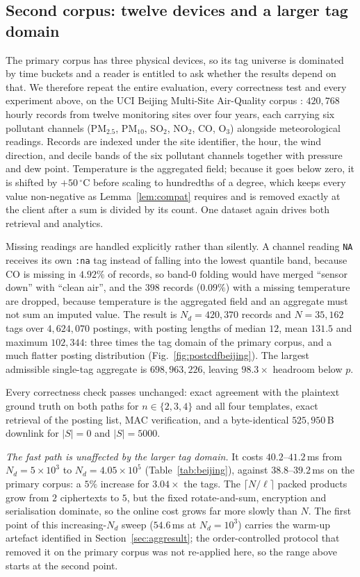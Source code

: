 \documentclass[a4paper,fleqn]{cas-dc}
\begin{document}
\subsection{Second corpus: twelve devices and a larger tag domain}
\label{sec:secondcorpus}
The primary corpus has three physical devices, so its tag universe is
dominated by time buckets and a reader is entitled to ask whether the results
depend on that. We therefore repeat the entire evaluation, every correctness
test and every experiment above, on the UCI Beijing Multi-Site Air-Quality
corpus \citep{zhang2017cautionary}: $420{,}768$ hourly records from twelve
monitoring sites over four years, each carrying six pollutant channels
(PM$_{2.5}$, PM$_{10}$, SO$_2$, NO$_2$, CO, O$_3$) alongside meteorological
readings. Records are indexed under the site identifier, the hour, the wind
direction, and decile bands of the six pollutant channels together with
pressure and dew point. Temperature is the aggregated field; because it goes
below zero, it is shifted by $+50\,^\circ$C before scaling to hundredths of a
degree, which keeps every value non-negative as Lemma~\ref{lem:compat}
requires and is removed exactly at the client after a sum is divided by its
count. One dataset again drives both retrieval and analytics.

Missing readings are handled explicitly rather than silently. A channel
reading \texttt{NA} receives its own \texttt{:na} tag instead of falling into
the lowest quantile band, because CO is missing in $4.92\%$ of records, so
band-$0$ folding would have merged ``sensor down'' with ``clean air'', and the
$398$ records ($0.09\%$) with a missing temperature are dropped, because
temperature is the aggregated field and an aggregate must not sum an imputed
value. The result is $N_d=420{,}370$ records and $N=35{,}162$ tags over
$4{,}624{,}070$ postings, with posting lengths of median $12$, mean $131.5$
and maximum $102{,}344$: three times the tag domain of the primary corpus, and
a much flatter posting distribution (Fig.~\ref{fig:postcdfbeijing}). The
largest admissible single-tag aggregate is $698{,}963{,}226$, leaving
$98.3\times$ headroom below $p$.

Every correctness check passes unchanged: exact agreement with the plaintext
ground truth on both paths for $n\in\{2,3,4\}$ and all four templates, exact
retrieval of the posting list, MAC verification, and a byte-identical
$525{,}950$\,B downlink for $|S|=0$ and $|S|=5000$.

\emph{The fast path is unaffected by the larger tag domain.} It costs
$40.2$--$41.2$\,ms from $N_d=5\times10^3$ to $N_d=4.05\times10^5$
(Table~\ref{tab:beijing}), against $38.8$--$39.2$\,ms on the primary corpus: a
$5\%$ increase for $3.04\times$ the tags. The $\lceil N/\ell\rceil$ packed
products grow from $2$ ciphertexts to $5$, but the fixed rotate-and-sum,
encryption and serialisation dominate, so the online cost grows far more
slowly than $N$. The first point of this increasing-$N_d$ sweep ($54.6$\,ms at
$N_d=10^3$) carries the warm-up artefact identified in
Section~\ref{sec:aggresult}; the order-controlled protocol that removed it on
the primary corpus was not re-applied here, so the range above starts at the
second point.
\end{document}
